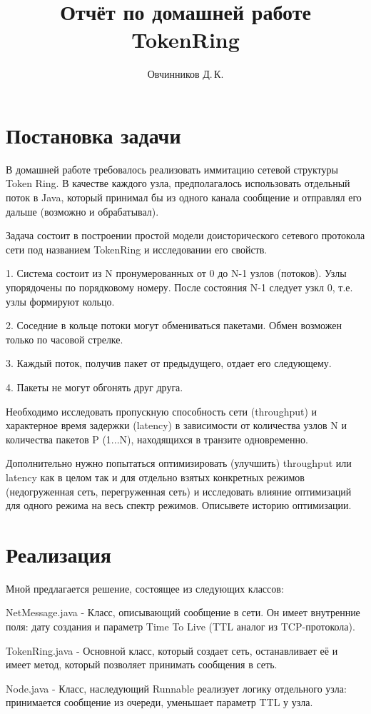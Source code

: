 \documentclass{mipt-thesis-bs}
\title{Отчёт по домашней работе TokenRing}
\author{Овчинников Д.\,К.}
\begin{document}
\frontmatter
\titlecontents
\chapter{Постановка задачи}
В домашней работе требовалось реализовать иммитацию сетевой структуры Token Ring. В качестве каждого узла, предполагалось использовать отдельный поток в Java, который принимал бы из одного канала сообщение и отправлял его дальше (возможно и обрабатывал).

Задача состоит в построении простой модели доисторического сетевого протокола сети под названием TokenRing и исследовании его свойств.

 

1. Система состоит из N пронумерованных от 0 до N-1 узлов (потоков). Узлы упорядочены по порядковому номеру. После состояния N-1 следует узкл 0, т.е. узлы формируют кольцо. 

2. Соседние в кольце потоки могут обмениваться пакетами. Обмен возможен только по часовой стрелке. 

3. Каждый поток, получив пакет от предыдущего, отдает его следующему.

4. Пакеты не могут обгонять друг друга.

 

Необходимо исследовать пропускную способность сети (throughput) и характерное время задержки (latency) в зависимости от количества узлов N и количества пакетов P (1...N), находящихся в транзите одновременно.

Дополнительно нужно попытаться оптимизировать (улучшить) throughput или latency как в целом так и для отдельно взятых конкретных режимов (недогруженная сеть, перегруженная сеть) и исследовать влияние оптимизаций для одного режима на весь спектр режимов. Описывете историю оптимизации.

\chapter{Реализация}
Мной предлагается решение, состоящее из следующих классов:

NetMessage.java - Класс, описывающий сообщение в сети. Он имеет внутренние поля: дату создания и параметр Time To Live (TTL аналог из TCP-протокола).

TokenRing.java - Основной класс, который создает сеть, останавливает её и имеет метод, который позволяет принимать сообщения в сеть.

Node.java - Класс, наследующий Runnable реализует логику отдельного узла: принимается сообщение из очереди, уменьшает параметр TTL у узла.
\end{document}

